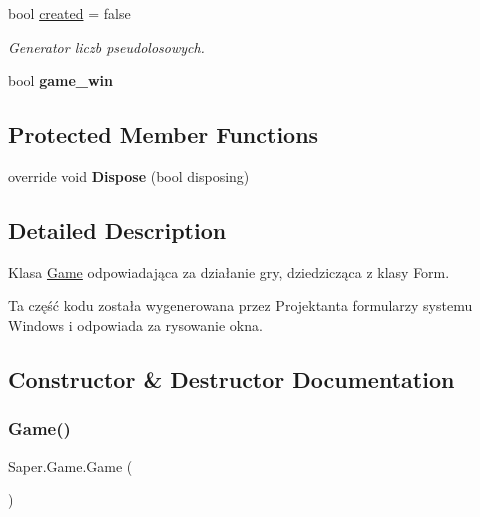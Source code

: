 \begin{DoxyCompactItemize}
\mbox{\label{class_saper_1_1_game_adc5efafe49ceab9315e68c8077db0800}} 
bool \mbox{\hyperlink{class_saper_1_1_game_adc5efafe49ceab9315e68c8077db0800}{created}} = false
\begin{DoxyCompactList}\small\item\em Generator liczb pseudolosowych. \end{DoxyCompactList}\item 
\mbox{\label{class_saper_1_1_game_a9cfb62bd4e52323d17b9a4f4b58f8a4f}} 
bool {\bfseries game\+\_\+win}
\end{DoxyCompactItemize}
\subsection*{Protected Member Functions}
\begin{DoxyCompactItemize}
\item 
\mbox{\label{class_saper_1_1_game_af10b28306097f647aea5dbc84196fcd1}} 
override void {\bfseries Dispose} (bool disposing)
\end{DoxyCompactItemize}


\subsection{Detailed Description}
Klasa \mbox{\hyperlink{class_saper_1_1_game}{Game}} odpowiadająca za działanie gry, dziedzicząca z klasy Form. 

Ta część kodu została wygenerowana przez Projektanta formularzy systemu Windows i odpowiada za rysowanie okna. 

\subsection{Constructor \& Destructor Documentation}
\mbox{\label{class_saper_1_1_game_a9d694a044fb311e088ce585b716a9d84}} 
\subsubsection{\texorpdfstring{Game()}{Game()}}
{\footnotesize\ttfamily Saper.\+Game.\+Game (\begin{DoxyParamCaption}{ }\end{DoxyParamCaption})}



